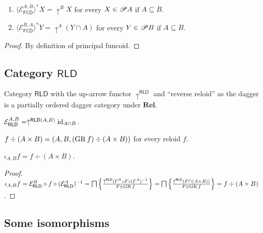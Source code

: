 \begin{prop}
  ~
  \begin{enumerate}
    \item $\langle \mathcal{E}_{\mathsf{FCD}}^{A,B} \rangle^{\ast} X
    = \uparrow^B X$ for every $X \in \mathscr{P} A$ if $A \subseteq B$.
    
    \item $\langle \mathcal{E}_{\mathsf{FCD}}^{B,A} \rangle^{\ast}
    Y = \uparrow^A (Y \cap A)$ for every $Y \in \mathscr{P} B$ if $A \subseteq
    B$.
  \end{enumerate}
\end{prop}

\begin{proof}
  By definition of principal funcoid.
\end{proof}

\subsection{\texorpdfstring{Category $\mathsf{RLD}$}{Category RLD}}

Category $\mathsf{RLD}$ with the up-arrow functor
$\uparrow^{\mathsf{RLD}}$ and ``reverse reloid'' as the dagger is a
partially ordered dagger category under $\mathbf{Rel}$.

\begin{obvious}
$\mathcal{E}_{\mathsf{RLD}}^{A,B} = \uparrow^{\mathsf{RLD} (A ,
B)} \operatorname{id}_{A \cap B}$.
\end{obvious}

\begin{defn}
  $f \div (A \times B) = (A , B , (\operatorname{GR} f) \div (A \times B))$ for every
  reloid $f$.
\end{defn}

\begin{prop}
  $\iota_{A, B} f = f \div (A \times B)$.
\end{prop}

\begin{proof}
  $\iota_{A, B} f = \mathcal{E}_{\mathsf{RLD}}^{B}
\circ f \circ (\mathcal{E}_{\mathsf{RLD}}^{A})^{-1} =
\bigsqcap \left\{ \frac{ \uparrow^{\mathsf{RLD}} (\mathcal{E}^{B} \circ F \circ (\mathcal{E}^{A})^{-1}
}{ F \in \operatorname{GR} f }\right\} = \bigsqcap \left\{ \frac{
\uparrow^{\mathsf{RLD}} (F \cap (A \times B))}{F \in \operatorname{GR} f }\right\} = f \div (A \times B)$.

\end{proof}

\subsection{Some isomorphisms}

